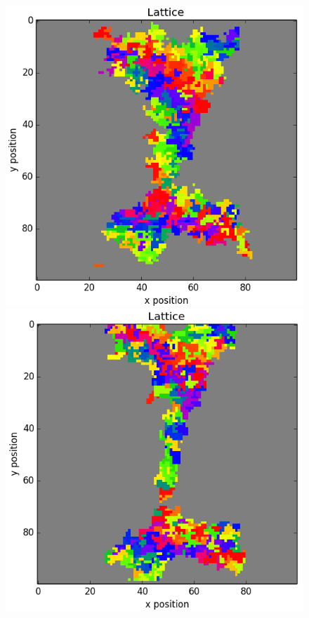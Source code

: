 \documentclass[12pt]{article}
\begin{document}
\begin{figure}[H]
	\includegraphics[scale=0.52]{img/nebula_9000}
	\includegraphics[scale=0.52]{img/nebula_13000}

\end{figure}
\end{document}
